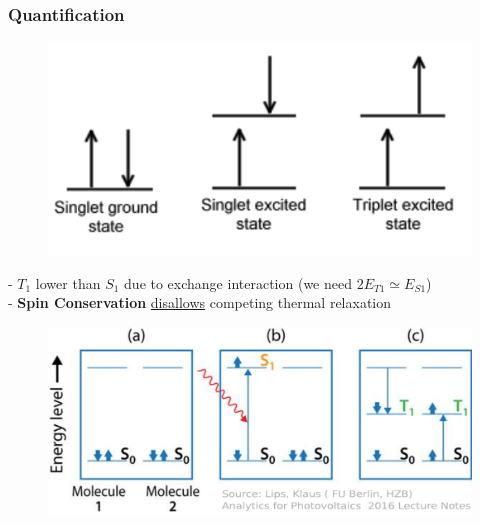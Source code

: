 \documentclass[compress]{beamer}
\begin{document}
\begin{frame}
  \frametitle{Quantification}

\begin{multicols}{2}

\begin{figure}[H]
\includegraphics[width=1\columnwidth]{../img/SF_esq7.pdf}
\end{figure}

- $T_1$ lower than $S_1$ due to exchange interaction (we need $2E_{T1}\simeq E_{S1}$)\\
- \textbf{Spin Conservation} \underline{disallows} competing thermal relaxation\\
\end{multicols}

\begin{figure}[H]
\includegraphics[width=1\columnwidth]{../img/SF_esq9.pdf}
\end{figure}


\end{frame}
\end{document}
